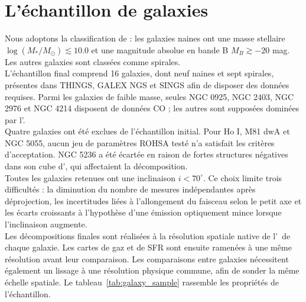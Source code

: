 

\section{L'échantillon de galaxies}
\label{sec:galaxy_sample}

Nous adoptons la classification de \citet{Leroy2008} : les galaxies naines ont une masse stellaire $\log(M_*/M_\odot) \lesssim 10.0$ et une magnitude absolue en bande B $M_B \gtrsim -20$ mag. Les autres galaxies sont classées comme spirales.\\\indent
L'échantillon final comprend 16 galaxies, dont neuf naines et sept spirales, présentes dans THINGS, GALEX NGS et SINGS afin de disposer des données requises. Parmi les galaxies de faible masse, seules NGC 0925, NGC 2403, NGC 2976 et NGC 4214 disposent de données CO ; les autres sont supposées dominées par l'\HI.\\\indent
Quatre galaxies ont été exclues de l'échantillon initial. Pour Ho I, M81 dwA et NGC 5055, aucun jeu de paramètres ROHSA testé n'a satisfait les critères d'acceptation. NGC 5236 a été écartée en raison de fortes structures négatives dans son cube d'\HI, qui affectaient la décomposition.\\\indent
Toutes les galaxies retenues ont une inclinaison $i < 70^\circ$. Ce choix limite trois difficultés : la diminution du nombre de mesures indépendantes après déprojection, les incertitudes liées à l'allongement du faisceau selon le petit axe et les écarts croissants à l'hypothèse d'une émission optiquement mince lorsque l'inclinaison augmente.\\\indent
Les décompositions finales sont réalisées à la résolution spatiale native de l'\HI\ de chaque galaxie. Les cartes de gaz et de SFR sont ensuite ramenées à une même résolution avant leur comparaison. Les comparaisons entre galaxies nécessitent également un lissage à une résolution physique commune, afin de sonder la même échelle spatiale. Le tableau~\ref{tab:galaxy_sample} rassemble les propriétés de l'échantillon.


